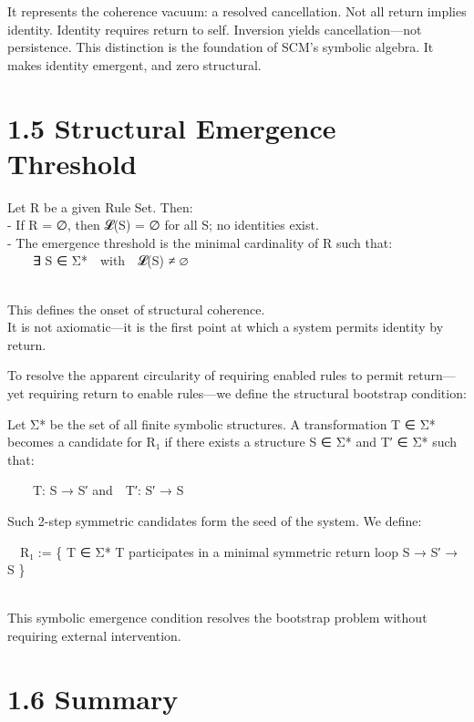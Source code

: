It represents the coherence vacuum: a resolved cancellation. Not all
return implies identity. Identity requires return to self. Inversion
yields cancellation---not persistence. This distinction is the
foundation of SCM's symbolic algebra. It makes identity emergent, and
zero structural.

\section{1.5 \textbar{} Structural Emergence
Threshold}\label{structural-emergence-threshold}

Let R be a given Rule Set. Then:\\
- If R = ∅, then 𝓛(S) = ∅ for all S; no identities exist.\\
- The emergence threshold is the minimal cardinality of R such that:\\
  ∃ S ∈ Σ* with 𝓛(S) ≠ ∅\\
\strut \\
This defines the onset of structural coherence.\\
It is not axiomatic---it is the first point at which a system permits
identity by return.

To resolve the apparent circularity of requiring enabled rules to permit
return---yet requiring return to enable rules---we define the structural
bootstrap condition:

Let Σ* be the set of all finite symbolic structures. A transformation T
∈ Σ* becomes a candidate for R₁ if there exists a structure S ∈ Σ* and
T′ ∈ Σ* such that:

  T: S → S′ and T′: S′ → S

Such 2-step symmetric candidates form the seed of the system. We define:

 R₁ := \{ T ∈ Σ* \textbar{} T participates in a minimal symmetric return
loop S → S′ → S \}\\
\strut \\
This symbolic emergence condition resolves the bootstrap problem without
requiring external intervention.

\section{1.6 \textbar{} Summary}\label{summary}

